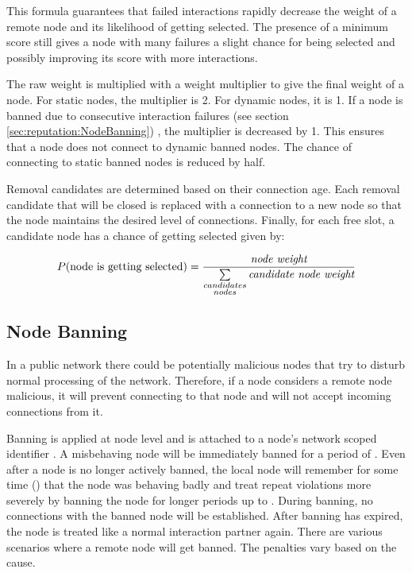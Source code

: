 This formula guarantees that failed interactions rapidly decrease the weight of a remote node and its likelihood of getting selected.
The presence of a minimum score still gives a node with many failures a slight chance for being selected and possibly improving its score with more interactions.

The raw weight is multiplied with a weight multiplier to give the final weight of a node.
For static nodes, the multiplier is 2.
For dynamic nodes, it is 1.
If a node is banned due to consecutive interaction failures (see section \autoref{sec:reputation:NodeBanning}) , the multiplier is decreased by 1.
This ensures that a node does not connect to dynamic banned nodes.
The chance of connecting to static banned nodes is reduced by half.

Removal candidates are determined based on their connection age.
Each removal candidate that will be closed is replaced with a connection to a new node so that the node maintains the desired level of connections.
Finally, for each free slot, a candidate node has a chance of getting selected given by:

\begin{align*}
P(\textrm{node is getting selected}) = \frac{\textit{node weight}}{\sum\limits_{\substack{candidates\\nodes}} \textit{candidate node weight}}
\end{align*}

\subsection{Node Banning}
\label{sec:reputation:NodeBanning}

In a public network there could be potentially malicious nodes that try to disturb normal processing of the network.
Therefore, if a node considers a remote node malicious, it will prevent connecting to that node and will not accept incoming connections from it.

Banning is applied at node level and is attached to a node's network scoped identifier .
A misbehaving node will be immediately banned for a period of .
Even after a node is no longer actively banned, the local node will remember for some time () that the node was behaving badly and treat repeat violations more severely by banning the node for longer periods up to .
During banning, no connections with the banned node will be established.
After banning has expired, the node is treated like a normal interaction partner again.
There are various scenarios where a remote node will get banned.
The penalties vary based on the cause.


